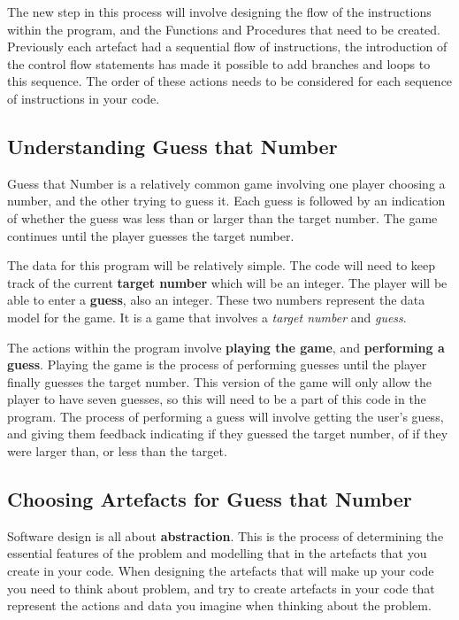 The new step in this process will involve designing the flow of the instructions within the program, and the Functions and Procedures that need to be created. Previously each artefact had a sequential flow of instructions, the introduction of the control flow statements has made it possible to add branches and loops to this sequence. The order of these actions needs to be considered for each sequence of instructions in your code.


\clearpage
\subsection{Understanding Guess that Number} %
\label{sub:understanding_guess_that_number}

Guess that Number is a relatively common game involving one player choosing a number, and the other trying to guess it. Each guess is followed by an indication of whether the guess was less than or larger than the target number. The game continues until the player guesses the target number.

The data for this program will be relatively simple. The code will need to keep track of the current \textbf{target number} which will be an integer. The player will be able to enter a \textbf{guess}, also an integer. These two numbers represent the data model for the game. It is a game that involves a \emph{target number} and \emph{guess}.

The actions within the program involve \textbf{playing the game}, and \textbf{performing a guess}. Playing the game is the process of performing guesses until the player finally guesses the target number. This version of the game will only allow the player to have seven guesses, so this will need to be a part of this code in the program. The process of performing a guess will involve getting the user's guess, and giving them feedback indicating if they guessed the target number, of if they were larger than, or less than the target.


\subsection{Choosing Artefacts for Guess that Number} %
\label{sub:choosing_artefacts_for_guess_that_number}

Software design is all about \textbf{abstraction}. This is the process of determining the essential features of the problem and modelling that in the artefacts that you create in your code. When designing the artefacts that will make up your code you need to think about problem, and try to create artefacts in your code that represent the actions and data you imagine when thinking about the problem.

